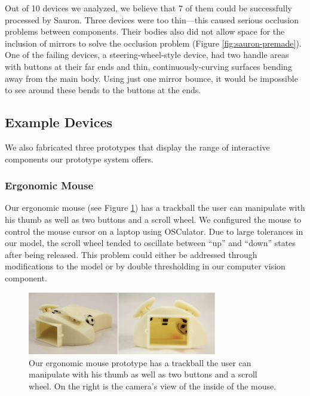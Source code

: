     Out of 10 devices we analyzed, we believe that 7 of them could be successfully processed by Sauron. Three devices were too thin---this caused serious occlusion problems between components. Their bodies also did not allow space for the inclusion of mirrors to solve the occlusion problem (Figure \ref{fig:sauron-premade}). One of the failing devices, a steering-wheel-style device, had two handle areas with buttons at their far ends and thin, continuously-curving surfaces bending away from the main body. Using just one mirror bounce, it would be impossible to see around these bends to the buttons at the ends.


    \subsection{Example Devices}
    We also fabricated three prototypes that display the range of interactive components our prototype system offers.

        \subsubsection{Ergonomic Mouse}
        Our ergonomic mouse (see Figure \ref{fig:sauron-ergomouse}) has a trackball the user can manipulate with his thumb as well as two buttons and a scroll wheel. We configured the mouse to control the mouse cursor on a laptop using OSCulator. Due to large tolerances in our model, the scroll wheel tended to oscillate between ``up'' and ``down'' states after being released. This problem could either be addressed through modifications to the model or by double thresholding in our computer vision component.
        
        
\begin{figure}
\centering
\includegraphics[width=3.25in]{figures/sauron/ergomouse.png}
\caption{Our ergonomic mouse prototype has a trackball the user can manipulate with his thumb as well as two buttons and a scroll wheel. On the right is the camera's view of the inside of the mouse.}
\label{fig:sauron-ergomouse}
\end{figure}

